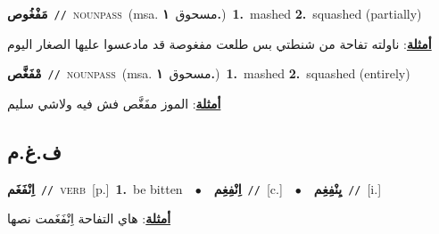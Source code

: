 \documentclass[10pt,a4paper,twoside]{article} %
\begin{document}
\begin{multicols}{2}
{\setlength\topsep{0pt}\textbf{\foreignlanguage{arabic}{مَفْغُوص}}\ {\color{gray}\texttt{//}\color{black}}\ \textsc{noun\textunderscore pass}\ \color{gray}(msa. \foreignlanguage{arabic}{مسحوق}~\foreignlanguage{arabic}{\textbf{١.}})\color{black}\ \textbf{1.}~mashed  \textbf{2.}~squashed (partially)\  \begin{flushright}\color{gray}\foreignlanguage{arabic}{\textbf{\underline{\foreignlanguage{arabic}{أمثلة}}}: ناولته تفاحة من شنطتي بس طلعت مفغوصة قد مادعسوا عليها الصغار اليوم}\end{flushright}\color{black}} \vspace{2mm}

{\setlength\topsep{0pt}\textbf{\foreignlanguage{arabic}{مْفَغَّص}}\ {\color{gray}\texttt{//}\color{black}}\ \textsc{noun\textunderscore pass}\ \color{gray}(msa. \foreignlanguage{arabic}{مسحوق}~\foreignlanguage{arabic}{\textbf{١.}})\color{black}\ \textbf{1.}~mashed  \textbf{2.}~squashed (entirely)\  \begin{flushright}\color{gray}\foreignlanguage{arabic}{\textbf{\underline{\foreignlanguage{arabic}{أمثلة}}}: الموز مفَغَّص  فش فيه ولاشي سليم}\end{flushright}\color{black}} \vspace{2mm}

\vspace{-3mm}
\subsection*{\color{blue}\foreignlanguage{arabic}{ف.غ.م}\color{blue}{}} 

{\setlength\topsep{0pt}\textbf{\foreignlanguage{arabic}{اِنْفَغَم}}\ {\color{gray}\texttt{//}\color{black}}\ \textsc{verb}\ [p.]\ \textbf{1.}~be bitten\ \ $\bullet$\ \ \setlength\topsep{0pt}\textbf{\foreignlanguage{arabic}{اِنْفِغِم}}\ {\color{gray}\texttt{//}\color{black}}\ [c.]\ \ $\bullet$\ \ \setlength\topsep{0pt}\textbf{\foreignlanguage{arabic}{يِنْفِغِم}}\ {\color{gray}\texttt{//}\color{black}}\ [i.]\  \begin{flushright}\color{gray}\foreignlanguage{arabic}{\textbf{\underline{\foreignlanguage{arabic}{أمثلة}}}: هاي التفاحة اِنْفَغَمت نصها}\end{flushright}\color{black}} \vspace{2mm}


\end{multicols}
\end{document}
